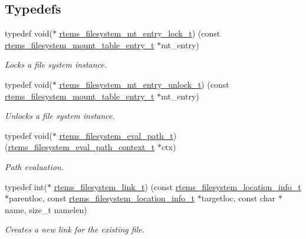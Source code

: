 \subsection*{Typedefs}
\begin{DoxyCompactItemize}
\item 
typedef void($\ast$ \mbox{\hyperlink{group__LibIOFSOps_gae6a0c55a60927170f228b90ede1032f9}{rtems\+\_\+filesystem\+\_\+mt\+\_\+entry\+\_\+lock\+\_\+t}}) (const \mbox{\hyperlink{structrtems__filesystem__mount__table__entry__tt}{rtems\+\_\+filesystem\+\_\+mount\+\_\+table\+\_\+entry\+\_\+t}} $\ast$mt\+\_\+entry)
\begin{DoxyCompactList}\small\item\em Locks a file system instance. \end{DoxyCompactList}\item 
typedef void($\ast$ \mbox{\hyperlink{group__LibIOFSOps_ga9a04cab210f543206c54fc78877cb884}{rtems\+\_\+filesystem\+\_\+mt\+\_\+entry\+\_\+unlock\+\_\+t}}) (const \mbox{\hyperlink{structrtems__filesystem__mount__table__entry__tt}{rtems\+\_\+filesystem\+\_\+mount\+\_\+table\+\_\+entry\+\_\+t}} $\ast$mt\+\_\+entry)
\begin{DoxyCompactList}\small\item\em Unlocks a file system instance. \end{DoxyCompactList}\item 
typedef void($\ast$ \mbox{\hyperlink{group__LibIOFSOps_ga49260fbd8e55e1ecb71daef115c751c4}{rtems\+\_\+filesystem\+\_\+eval\+\_\+path\+\_\+t}}) (\mbox{\hyperlink{structrtems__filesystem__eval__path__context__t}{rtems\+\_\+filesystem\+\_\+eval\+\_\+path\+\_\+context\+\_\+t}} $\ast$ctx)
\begin{DoxyCompactList}\small\item\em Path evaluation. \end{DoxyCompactList}\item 
typedef int($\ast$ \mbox{\hyperlink{group__LibIOFSOps_ga13198d873ccc0493d7ba970d4429502f}{rtems\+\_\+filesystem\+\_\+link\+\_\+t}}) (const \mbox{\hyperlink{group__LibIO_ga3252b3d31ee3c49ffff0b7604a676864}{rtems\+\_\+filesystem\+\_\+location\+\_\+info\+\_\+t}} $\ast$parentloc, const \mbox{\hyperlink{group__LibIO_ga3252b3d31ee3c49ffff0b7604a676864}{rtems\+\_\+filesystem\+\_\+location\+\_\+info\+\_\+t}} $\ast$targetloc, const char $\ast$name, size\+\_\+t namelen)
\begin{DoxyCompactList}\small\item\em Creates a new link for the existing file. \end{DoxyCompactList}\item 

\end{DoxyCompactItemize}
